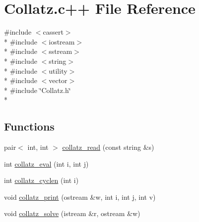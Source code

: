\hypertarget{Collatz_8c_09_09}{\section{Collatz.\-c++ File Reference}
\label{Collatz_8c_09_09}
}
{\ttfamily \#include $<$cassert$>$}\\*
{\ttfamily \#include $<$iostream$>$}\\*
{\ttfamily \#include $<$sstream$>$}\\*
{\ttfamily \#include $<$string$>$}\\*
{\ttfamily \#include $<$utility$>$}\\*
{\ttfamily \#include $<$vector$>$}\\*
{\ttfamily \#include \char`\"{}Collatz.\-h\char`\"{}}\\*
\subsection*{Functions}
\begin{DoxyCompactItemize}
\item 
pair$<$ int, int $>$ \hyperlink{Collatz_8c_09_09_aeb2edb6ee16627fa3682f57c7cbf3662}{collatz\-\_\-read} (const string \&s)
\item 
int \hyperlink{Collatz_8c_09_09_a0b0d3827a619c18aa4d96b8ee8b1c47d}{collatz\-\_\-eval} (int i, int j)
\item 
int \hyperlink{Collatz_8c_09_09_acf9b620a17fbd223eb91e368eb361012}{collatz\-\_\-cyclen} (int i)
\item 
void \hyperlink{Collatz_8c_09_09_aeda0b7ea3e40e1e7487ccc436f33a559}{collatz\-\_\-print} (ostream \&w, int i, int j, int v)
\item 
void \hyperlink{Collatz_8c_09_09_a0ac646d2122741f9a9a52201bf9551cc}{collatz\-\_\-solve} (istream \&r, ostream \&w)
\end{DoxyCompactItemize}


